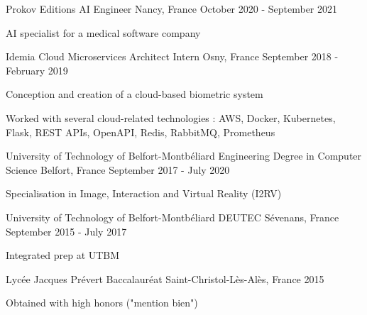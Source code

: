 \documentclass[11pt, a4paper]{awesome-cv}
\begin{document}

\begin{cventries}

  \cventry
  {Prokov Editions}
  {AI Engineer}
  {Nancy, France}
  {October 2020 - September 2021}
  {
    \begin{cvitems}
      \item AI specialist for a medical software company
    \end{cvitems}
  }

  \cventry
  {Idemia}
  {Cloud Microservices Architect Intern}
  {Osny, France}
  {September 2018 - February 2019}
  {
    \begin{cvitems}
      \item Conception and creation of a cloud-based biometric system
      \item Worked with several cloud-related technologies : AWS, Docker, Kubernetes, Flask, REST APIs, OpenAPI, Redis, RabbitMQ, Prometheus
    \end{cvitems}
  }

\end{cventries}



\begin{cventries}

  \cventry
  {University of Technology of Belfort-Montbéliard}
  {Engineering Degree in Computer Science}
  {Belfort, France}
  {September 2017 - July 2020}
  {
    \begin{cvitems}
      \item Specialisation in Image, Interaction and Virtual Reality (I2RV)
    \end{cvitems}
  }

  \cventry
  {University of Technology of Belfort-Montbéliard}
  {DEUTEC}
  {Sévenans, France}
  {September 2015 - July 2017}
  {
    \begin{cvitems}
      \item Integrated prep at UTBM
    \end{cvitems}
  }

  \cventry
  {Lycée Jacques Prévert}
  {Baccalauréat}
  {Saint-Christol-Lès-Alès, France}
  {2015}
  {
    \begin{cvitems}
      \item Obtained with high honors ("mention bien")
    \end{cvitems}
  }

\end{cventries}
\end{document}
